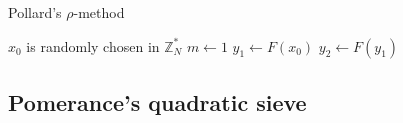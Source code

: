 \begin{algorithm}
\caption{Pollard's $\rho$-method}\label{alg:pollard_rho_method}

$x_{0}$ is randomly chosen in $\mathbb{Z}_{N}^{*}$\;
$m \gets 1$\;
$y_{1} \gets F(x_{0})$\;
$y_{2} \gets F(y_{1})$\;
\end{algorithm}

\subsection{Pomerance's quadratic sieve}
